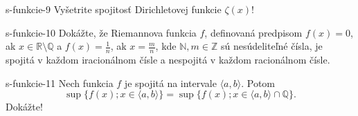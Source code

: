 	\begin{defproblem}{s-funkcie-9}
	Vyšetrite spojitosť Dirichletovej funkcie $\zeta (x)$!
	\end{defproblem}
	
	\begin{defproblem}{s-funkcie-10}
	Dokážte, že Riemannova funkcia $f$, definovaná predpisom $f(x)=0$, ak $x \in \mathbb{R} \setminus \mathbb{Q}$ a $f(x)=\frac{1}{n}$, ak $x=\frac{m}{n}$, kde $\mathbb{N}, m \in \mathbb{Z}$ sú nesúdeliteľné čísla, je spojitá v každom iracionálnom čísle a nespojitá v každom racionálnom čísle.
	\end{defproblem}
	
	\begin{defproblem}{s-funkcie-11}
	Nech funkcia $f$ je spojitá na intervale $\langle a,b \rangle$. Potom $$\sup \{f(x); x \in \langle a,b \rangle\}= \sup \{f(x); x \in \langle a,b \rangle \cap \mathbb{Q}\}.$$ Dokážte!
	\end{defproblem}
	

